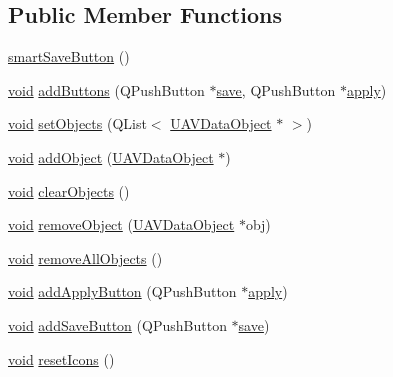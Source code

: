 \subsection*{\-Public \-Member \-Functions}
\begin{DoxyCompactItemize}
\item 
\hyperlink{group___u_a_v_object_widget_utils_gaea82e458c940bce5635289974c09f02f}{smart\-Save\-Button} ()
\item 
\hyperlink{group___u_a_v_objects_plugin_ga444cf2ff3f0ecbe028adce838d373f5c}{void} \hyperlink{group___u_a_v_object_widget_utils_gaf6869cfd1fefcbd90df4481101aedae0}{add\-Buttons} (\-Q\-Push\-Button $\ast$\hyperlink{group___u_a_v_object_widget_utils_gad0e6541ace97075634254ba3b1cc9bf9}{save}, \-Q\-Push\-Button $\ast$\hyperlink{group___u_a_v_object_widget_utils_ga453b1bbd8b56fa6af4f362b00221b265}{apply})
\item 
\hyperlink{group___u_a_v_objects_plugin_ga444cf2ff3f0ecbe028adce838d373f5c}{void} \hyperlink{group___u_a_v_object_widget_utils_gabc52b717610cbaa7e592ca114e280a7a}{set\-Objects} (\-Q\-List$<$ \hyperlink{class_u_a_v_data_object}{\-U\-A\-V\-Data\-Object} $\ast$ $>$)
\item 
\hyperlink{group___u_a_v_objects_plugin_ga444cf2ff3f0ecbe028adce838d373f5c}{void} \hyperlink{group___u_a_v_object_widget_utils_gac2164be4d041b63639a01ac473d95463}{add\-Object} (\hyperlink{class_u_a_v_data_object}{\-U\-A\-V\-Data\-Object} $\ast$)
\item 
\hyperlink{group___u_a_v_objects_plugin_ga444cf2ff3f0ecbe028adce838d373f5c}{void} \hyperlink{group___u_a_v_object_widget_utils_ga0907c8e3ee212fbe30183359c0d8bc1a}{clear\-Objects} ()
\item 
\hyperlink{group___u_a_v_objects_plugin_ga444cf2ff3f0ecbe028adce838d373f5c}{void} \hyperlink{group___u_a_v_object_widget_utils_ga3543686402e11b7eb8f0822c0a9bb4de}{remove\-Object} (\hyperlink{class_u_a_v_data_object}{\-U\-A\-V\-Data\-Object} $\ast$obj)
\item 
\hyperlink{group___u_a_v_objects_plugin_ga444cf2ff3f0ecbe028adce838d373f5c}{void} \hyperlink{group___u_a_v_object_widget_utils_ga2e09103bceedaf1f2756c7a688da035c}{remove\-All\-Objects} ()
\item 
\hyperlink{group___u_a_v_objects_plugin_ga444cf2ff3f0ecbe028adce838d373f5c}{void} \hyperlink{group___u_a_v_object_widget_utils_gab4059d84ec9c8e40beed303a7ad8550a}{add\-Apply\-Button} (\-Q\-Push\-Button $\ast$\hyperlink{group___u_a_v_object_widget_utils_ga453b1bbd8b56fa6af4f362b00221b265}{apply})
\item 
\hyperlink{group___u_a_v_objects_plugin_ga444cf2ff3f0ecbe028adce838d373f5c}{void} \hyperlink{group___u_a_v_object_widget_utils_ga85e413cf895d8a514e748a8ebf6a67ec}{add\-Save\-Button} (\-Q\-Push\-Button $\ast$\hyperlink{group___u_a_v_object_widget_utils_gad0e6541ace97075634254ba3b1cc9bf9}{save})
\item 
\hyperlink{group___u_a_v_objects_plugin_ga444cf2ff3f0ecbe028adce838d373f5c}{void} \hyperlink{group___u_a_v_object_widget_utils_ga851955edd99204e2b209b7fa604129fe}{reset\-Icons} ()
\end{DoxyCompactItemize}


